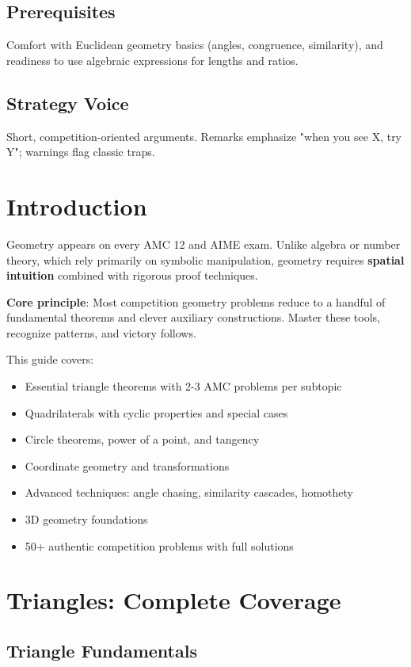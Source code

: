 ﻿\documentclass[12pt]{extarticle}
\begin{document}
\subsection*{Prerequisites}
Comfort with Euclidean geometry basics (angles, congruence, similarity), and readiness to use algebraic expressions for lengths and ratios.

\subsection*{Strategy Voice}
Short, competition-oriented arguments. Remarks emphasize "when you see X, try Y"; warnings flag classic traps.

\newpage

\section{Introduction}

Geometry appears on every AMC 12 and AIME exam. Unlike algebra or number theory, which rely primarily on symbolic manipulation, geometry requires \textbf{spatial intuition} combined with rigorous proof techniques.

\textbf{Core principle}: Most competition geometry problems reduce to a handful of fundamental theorems and clever auxiliary constructions. Master these tools, recognize patterns, and victory follows.

This guide covers:
\begin{itemize}
    \item Essential triangle theorems with 2-3 AMC problems per subtopic
    \item Quadrilaterals with cyclic properties and special cases
    \item Circle theorems, power of a point, and tangency
    \item Coordinate geometry and transformations
    \item Advanced techniques: angle chasing, similarity cascades, homothety
    \item 3D geometry foundations
    \item 50+ authentic competition problems with full solutions
\end{itemize}

\section{Triangles: Complete Coverage}

\subsection{Triangle Fundamentals}
\end{document}
